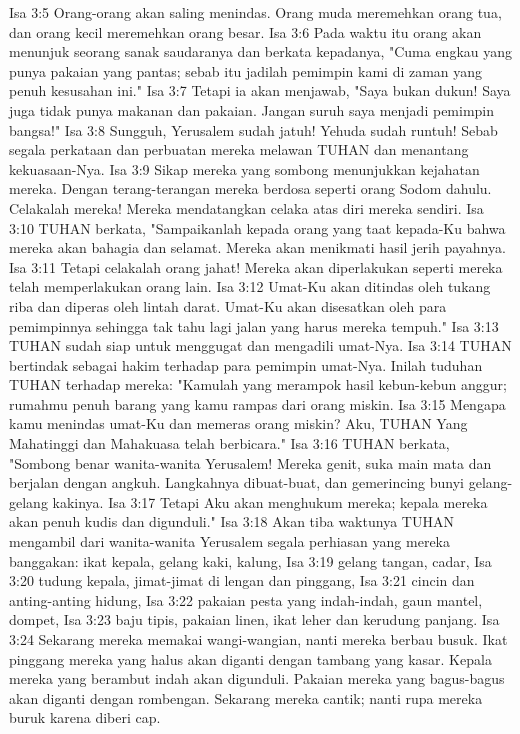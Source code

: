 Isa 3:5  Orang-orang akan saling menindas. Orang muda meremehkan orang tua, dan orang kecil meremehkan orang besar.
Isa 3:6  Pada waktu itu orang akan menunjuk seorang sanak saudaranya dan berkata kepadanya, "Cuma engkau yang punya pakaian yang pantas; sebab itu jadilah pemimpin kami di zaman yang penuh kesusahan ini."
Isa 3:7  Tetapi ia akan menjawab, "Saya bukan dukun! Saya juga tidak punya makanan dan pakaian. Jangan suruh saya menjadi pemimpin bangsa!"
Isa 3:8  Sungguh, Yerusalem sudah jatuh! Yehuda sudah runtuh! Sebab segala perkataan dan perbuatan mereka melawan TUHAN dan menantang kekuasaan-Nya.
Isa 3:9  Sikap mereka yang sombong menunjukkan kejahatan mereka. Dengan terang-terangan mereka berdosa seperti orang Sodom dahulu. Celakalah mereka! Mereka mendatangkan celaka atas diri mereka sendiri.
Isa 3:10  TUHAN berkata, "Sampaikanlah kepada orang yang taat kepada-Ku bahwa mereka akan bahagia dan selamat. Mereka akan menikmati hasil jerih payahnya.
Isa 3:11  Tetapi celakalah orang jahat! Mereka akan diperlakukan seperti mereka telah memperlakukan orang lain.
Isa 3:12  Umat-Ku akan ditindas oleh tukang riba dan diperas oleh lintah darat. Umat-Ku akan disesatkan oleh para pemimpinnya sehingga tak tahu lagi jalan yang harus mereka tempuh."
Isa 3:13  TUHAN sudah siap untuk menggugat dan mengadili umat-Nya.
Isa 3:14  TUHAN bertindak sebagai hakim terhadap para pemimpin umat-Nya. Inilah tuduhan TUHAN terhadap mereka: "Kamulah yang merampok hasil kebun-kebun anggur; rumahmu penuh barang yang kamu rampas dari orang miskin.
Isa 3:15  Mengapa kamu menindas umat-Ku dan memeras orang miskin? Aku, TUHAN Yang Mahatinggi dan Mahakuasa telah berbicara."
Isa 3:16  TUHAN berkata, "Sombong benar wanita-wanita Yerusalem! Mereka genit, suka main mata dan berjalan dengan angkuh. Langkahnya dibuat-buat, dan gemerincing bunyi gelang-gelang kakinya.
Isa 3:17  Tetapi Aku akan menghukum mereka; kepala mereka akan penuh kudis dan digunduli."
Isa 3:18  Akan tiba waktunya TUHAN mengambil dari wanita-wanita Yerusalem segala perhiasan yang mereka banggakan: ikat kepala, gelang kaki, kalung,
Isa 3:19  gelang tangan, cadar,
Isa 3:20  tudung kepala, jimat-jimat di lengan dan pinggang,
Isa 3:21  cincin dan anting-anting hidung,
Isa 3:22  pakaian pesta yang indah-indah, gaun mantel, dompet,
Isa 3:23  baju tipis, pakaian linen, ikat leher dan kerudung panjang.
Isa 3:24  Sekarang mereka memakai wangi-wangian, nanti mereka berbau busuk. Ikat pinggang mereka yang halus akan diganti dengan tambang yang kasar. Kepala mereka yang berambut indah akan digunduli. Pakaian mereka yang bagus-bagus akan diganti dengan rombengan. Sekarang mereka cantik; nanti rupa mereka buruk karena diberi cap.
